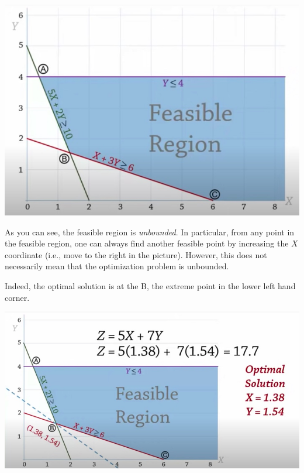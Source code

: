 \begin{center}
\includegraphics[scale = 0.4]{screenshots/example1-feasible-region}
\end{center}

As you can see, the feasible region is \emph{unbounded}.  In particular, from any point in the feasible region, one can always find another feasible point by increasing the $X$ coordinate (i.e., move to the right in the picture).   However, this does not necessarily mean that the optimization problem is unbounded.

Indeed, the optimal solution is at the B, the extreme point in the lower left hand corner.


\begin{center}
\includegraphics[scale = 0.4]{screenshots/example1-optimal-solution}
\end{center}


